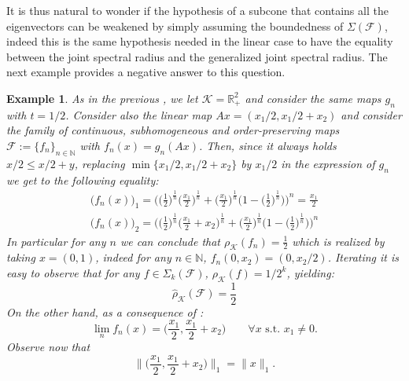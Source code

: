 \documentclass{article}
\newtheorem{example}[theorem]{Example}
\newcommand{\R}{\mathbb{R}}
\newcommand{\N}{\mathbb{N}}
\newcommand{\family}{\mathcal{F}}
\newcommand{\cradius}{\rho_{\cone}}
\newcommand{\cgradius}{\widehat{\rho}_{\cone}}
\newcommand{\cone}{\mathcal{K}}
\begin{document}
    It is thus natural to wonder if the hypothesis of a subcone that contains all the eigenvectors can be weakened by simply assuming the boundedness of $\Sigma(\family)$, indeed this is the same hypothesis needed in the linear case to have the equality between the joint spectral radius and the generalized joint spectral radius. The next example provides a negative answer to this question.

\begin{example}\label{Example_spectral_radius_and_generalized_sr_can_be_different}
As in the previous , we let $\cone=\R^2_+$ and consider the same maps $g_n$ with $t=1/2$. Consider also the linear map $Ax=(x_1/2,x_1/2+x_2)$ and consider the family of continuous, subhomogeneous and order-preserving maps $\family:=\{f_n\}_{n\in \N}$ with $f_n(x)=g_n(Ax)$. Then, since it always holds $x/2\leq x/2+y$, replacing $\min\{x_1/2,x_1/2+x_2\}$ by $x_1/2$ in the expression of $g_n$ we get to the following equality: 
\begin{equation}
\begin{aligned}
    \big(f_n(x)\big)_1=\bigg(\Big(\frac{1}{2}\Big)^{\frac{1}{n}}\Big(\frac{x_1}{2}\Big)^{\frac{1}{n}}+\Big(\frac{x_1}{2}\Big)^{\frac{1}{n}}\Big(1-\Big(\frac{1}{2}\Big)^{\frac{1}{n}}\Big) \bigg)^n=\frac{x_1}{2}\\
    \big(f_n(x)\big)_2=\bigg(\Big(\frac{1}{2}\Big)^{\frac{1}{n}}\Big(\frac{x_1}{2}+x_2\Big)^{\frac{1}{n}}+\Big(\frac{x_1}{2}\Big)^{\frac{1}{n}}\Big(1-\Big(\frac{1}{2}\Big)^{\frac{1}{n}}\Big) \bigg)^n
\end{aligned}
\end{equation}
In particular for any $n$ we can conclude that $\cradius(f_n)=\frac{1}{2}$ which is realized by taking $x=(0,1)$, indeed for any $n\in \N$, $f_n(0,x_2)=(0,x_2/2)$. Iterating it is easy to observe that for any $f\in \Sigma_k(\family)$, $\cradius(f)=1/2^k$, yielding:
\begin{equation}
    \cgradius(\family)=\frac{1}{2}
\end{equation}
On the other hand, as a consequence of 
%
: 
\begin{equation}
    \lim_n f_n(x)=\Big(\frac{x_1}{2},\frac{x_1}{2}+x_2\Big)\qquad \forall x \text{ s.t. } x_1\neq 0.
\end{equation}
%
Observe now that 
%
\begin{equation}
    \Big\|\Big(\frac{x_1}{2},\frac{x_1}{2}+x_2\Big)\Big\|_1=\|x\|_1.
\end{equation}

\end{example}
\end{document}
